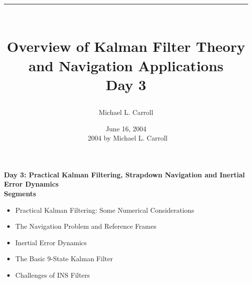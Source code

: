 \documentclass{beamer}
\begin{document}
\title{\rule{.35\linewidth}{.4pt}\\[1.5ex]
Overview of Kalman Filter Theory and Navigation Applications\\
Day 3}
\author{Michael L. Carroll}
\date{June 16, 2004\\
\vfill \hrulefill \vspace*{.25in} \vfill
{\tiny \textcopyright\ 2004 by Michael L. Carroll}
}
\maketitle
\begin{frame}
\textbf{Day 3: Practical Kalman Filtering, Strapdown Navigation and Inertial Error Dynamics\\
Segments}
 \begin{itemize}
 \item Practical Kalman Filtering:  Some Numerical Considerations
 \item The Navigation Problem and Reference Frames
 \item Inertial Error Dynamics
 \item The Basic 9-State Kalman Filter
 \item Challenges of INS Filters
\end{itemize}
\end{frame}





\end{document}
